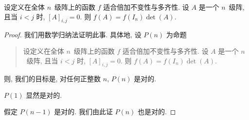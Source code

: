 \documentclass[../libro.tex]{subfiles}
\begin{document}
\begin{theorem}
    设定义在全体 \(n\)~级阵上的函数 \(f\)
    适合倍加不变性与多齐性.
    设 \(A\) 是一个 \(n\)~级阵,
    且当 \(i < j\) 时, \([A]_{i,j} = 0\).
    则 \(f(A) = f(I_n) \det {(A)}\).
\end{theorem}

\begin{proof}
    我们用数学归纳法证明此事.
    具体地, 设 \(P(n)\) 为命题
    \begin{quotation}
        设定义在全体 \(n\)~级阵上的函数 \(f\)
        适合倍加不变性与多齐性.
        设 \(A\) 是一个 \(n\)~级阵,
        且当 \(i < j\) 时, \([A]_{i,j} = 0\).
        则 \(f(A) = f(I_n) \det {(A)}\).
    \end{quotation}
    则, 我们的目标是,
    对任何正整数 \(n\), \(P(n)\) 是对的.

    \(P(1)\) 显然是对的.

    假定 \(P(n-1)\) 是对的.
    我们由此证 \(P(n)\) 也是对的.


\end{proof}
\end{document}
